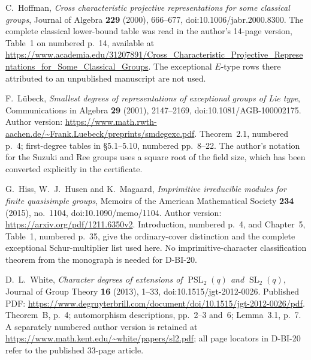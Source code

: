 C.~Hoffman, \emph{Cross characteristic projective representations
for some classical groups}, Journal of Algebra \textbf{229} (2000),
666--677, doi:10.1006/jabr.2000.8300.
The complete classical lower-bound table was read in the author's
14-page version, Table~1 on numbered p.~14, available at
\url{https://www.academia.edu/31207891/Cross_Characteristic_Projective_Representations_for_Some_Classical_Groups}.
The exceptional $E$-type rows there attributed to an unpublished
manuscript are not used.

F.~L\"ubeck, \emph{Smallest degrees of representations of exceptional
groups of Lie type}, Communications in Algebra \textbf{29} (2001),
2147--2169, doi:10.1081/AGB-100002175.
Author version: \url{https://www.math.rwth-aachen.de/~Frank.Luebeck/preprints/smdegexc.pdf}.
Theorem~2.1, numbered p.~4; first-degree tables in \S5.1--5.10,
numbered pp.~8--22.  The author's notation for the Suzuki and
Ree groups uses a square root of the field size, which has been
converted explicitly in the certificate.

G.~Hiss, W.~J.~Husen and K.~Magaard,
\emph{Imprimitive irreducible modules for finite quasisimple groups},
Memoirs of the American Mathematical Society \textbf{234} (2015),
no.~1104, doi:10.1090/memo/1104.
Author version: \url{https://arxiv.org/pdf/1211.6350v2}.
Introduction, numbered p.~4, and Chapter~5, Table~1, numbered p.~35,
give the ordinary-cover distinction and the complete exceptional
Schur-multiplier list used here.  No imprimitive-character
classification theorem from the monograph is needed for D-BI-20.

D.~L.~White, \emph{Character degrees of extensions of
$\operatorname{PSL}_2(q)$ and $\operatorname{SL}_2(q)$},
Journal of Group Theory \textbf{16} (2013), 1--33,
doi:10.1515/jgt-2012-0026.
Published PDF: \url{https://www.degruyterbrill.com/document/doi/10.1515/jgt-2012-0026/pdf}.
Theorem~B, p.~4; automorphism descriptions, pp.~2--3 and~6;
Lemma~3.1, p.~7.  A separately numbered author version is retained
at \url{https://www.math.kent.edu/~white/papers/sl2.pdf}; all
page locators in D-BI-20 refer to the published 33-page article.
